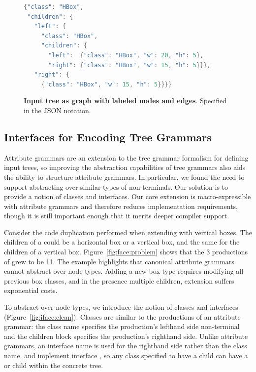 \begin{figure}
\begin{lstlisting}[language=C++,morekeywords={spawn,join,reverse,parallel_for}]
{"class": "HBox",
 "children": {
   "left": {
     "class": "HBox",
     "children": {
       "left":  {"class": "HBox", "w": 20, "h": 5},
       "right": {"class": "HBox", "w": 15, "h": 5}}},
   "right": {
     {"class": "HBox", "w": 15, "h": 5}}}}
\end{lstlisting}
\caption{\textbf{Input tree as graph with labeled nodes and edges}. Specified in the JSON notation.}
\label{fig:hboxjson}
\end{figure}

\subsection{Interfaces for Encoding Tree Grammars}
Attribute grammars are an extension to the tree grammar formalism for defining input trees, so improving the abstraction capabilities of tree grammars also aids the ability to structure attribute grammars. In particular, we found the need to support  abstracting over similar types of non-terminals. Our solution is to provide a notion of classes and interfaces. Our core extension is macro-expressible with attribute grammars and therefore reduces implementation requirements, though it is still important enough that it merits deeper compiler support. 


Consider the code duplication performed when extending \hlang with vertical boxes. The children of a  could be a horizontal box or a vertical box, and the same for the children of a vertical box. Figure~\ref{fig:face:problem} shows that the 3 productions of \hlang grew to be 11. The example highlights that canonical attribute grammars cannot abstract over node types. Adding a new box type requires modifying all previous box classes, and in the presence multiple children, extension suffers exponential costs. 

To abstract over node types, we introduce the notion of classes and interfaces (Figure~\ref{fig:iface:clean}). Classes are similar to the productions of an attribute grammar: the class name specifies the production's lefthand side non-terminal and the children block specifies the production's righthand side. Unlike attribute grammars, an interface name is used for the righthand side rather than the class name.  and  implement interface , so any class specified to have a  child can have a  or  child within the concrete tree. 


